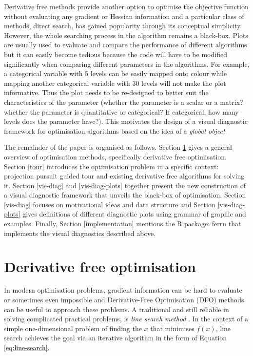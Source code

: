 \documentclass[12pt]{article}
\begin{document}
Derivative free methods provide another option to optimise the objective
function without evaluating any gradient or Hessian information and a
particular class of methods, direct search, has gained popularity
through its conceptual simplicity. However, the whole searching process
in the algorithm remains a black-box. Plots are usually used to evaluate
and compare the performance of different algorithms but it can easily
become tedious because the code will have to be modified significantly
when comparing different parameters in the algorithms. For example, a
categorical variable with 5 levels can be easily mapped onto colour
while mapping another categorical variable with 30 levels will not make
the plot informative. Thus the plot needs to be re-designed to better
suit the characteristics of the parameter (whether the parameter is a
scalar or a matrix? whether the parameter is quantitative or
categorical? If categorical, how many levels does the parameter have?).
This motivates the design of a visual diagnostic framework for
optimisation algorithms based on the idea of a \emph{global object}.

The remainder of the paper is organised as follows. Section \ref{DFO}
gives a general overview of optimisation methods, specifically
derivative free optimisation. Section \ref{tour} introduces the
optimisation problem in a specific context: projection pursuit guided
tour and existing derivative free algorithms for solving it. Section
\ref{vis-diag} and \ref{vis-diag-plots} together present the new
construction of a visual diagnostic framework that unveils the black-box
of optimisation. Section \ref{vis-diag} focuses on motivational ideas
and data structure and Section \ref{vis-diag-plots} gives definitions of
different diagnostic plots using grammar of graphic and examples.
Finally, Section \ref{implementation} mentions the R package: ferrn that
implements the visual diagnostics described above.

\hypertarget{DFO}{%
\section{Derivative free optimisation}\label{DFO}}

In modern optimisation problems, gradient information can be hard to
evaluate or sometimes even impossible and Derivative-Free Optimisation
(DFO) methods can be useful to approach these problems. A traditional
and still reliable in solving complicated practical problems, is
\emph{line search method} \citep{fletcher2013practical}. In the context
of a simple one-dimensional problem of finding the \(x\) that minimises
\(f(x)\), line search achieves the goal via an iterative algorithm in
the form of Equation \ref{eq:line-search}.
\end{document}
